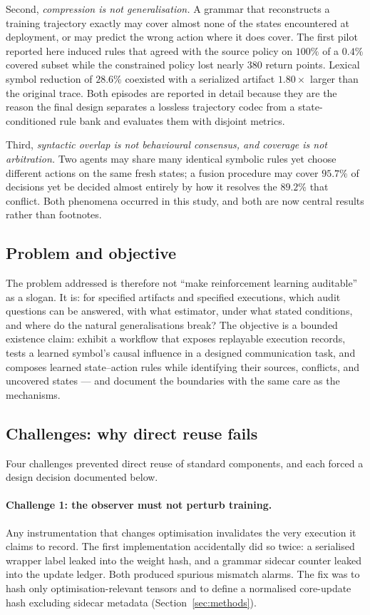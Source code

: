 \documentclass[11pt,a4paper]{article}
\theoremstyle{definition}
\begin{document}
Second, \emph{compression is not generalisation.} A grammar that reconstructs
a training trajectory exactly may cover almost none of the states encountered
at deployment, or may predict the wrong action where it does cover. The first
pilot reported here induced rules that agreed with the source policy on
$100\%$ of a $0.4\%$ covered subset while the constrained policy lost nearly
$380$ return points. Lexical symbol reduction of $28.6\%$ coexisted with a
serialized artifact $1.80\times$ larger than the original trace. Both episodes
are reported in detail because they are the reason the final design separates
a lossless trajectory codec from a state-conditioned rule bank and evaluates
them with disjoint metrics.

Third, \emph{syntactic overlap is not behavioural consensus, and coverage is
not arbitration.} Two agents may share many identical symbolic rules yet
choose different actions on the same fresh states; a fusion procedure may
cover $95.7\%$ of decisions yet be decided almost entirely by how it resolves
the $89.2\%$ that conflict. Both phenomena occurred in this study, and both
are now central results rather than footnotes.

\subsection{Problem and objective}

The problem addressed is therefore not ``make reinforcement learning
auditable'' as a slogan. It is: for specified artifacts and specified
executions, which audit questions can be answered, with what estimator, under
what stated conditions, and where do the natural generalisations break? The
objective is a bounded existence claim: exhibit a workflow that exposes
replayable execution records, tests a learned symbol's causal influence in a
designed communication task, and composes learned state--action rules while
identifying their sources, conflicts, and uncovered states --- and document
the boundaries with the same care as the mechanisms.

\subsection{Challenges: why direct reuse fails}

Four challenges prevented direct reuse of standard components, and each
forced a design decision documented below.

\paragraph{Challenge 1: the observer must not perturb training.}
Any instrumentation that changes optimisation invalidates the very execution
it claims to record. The first implementation accidentally did so twice: a
serialised wrapper label leaked into the weight hash, and a grammar sidecar
counter leaked into the update ledger. Both produced spurious mismatch
alarms. The fix was to hash only optimisation-relevant tensors and to define
a normalised core-update hash excluding sidecar metadata
(Section~\ref{sec:methods}).
\end{document}

